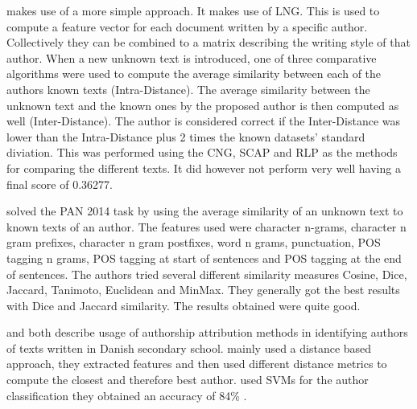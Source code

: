 \cite{layton:2014} makes use of a more simple approach. It makes use of
\gls{LNG}. This is used to compute a feature vector for each document written
by a specific author. Collectively they can be combined to a matrix describing
the writing style of that author. When a new unknown text is introduced, one of
three comparative algorithms were used to compute the average similarity between
each of the authors known texts (Intra-Distance). The average similarity between
the unknown text and the known ones by the proposed author is then computed as
well (Inter-Distance). The author is considered correct if the Inter-Distance
was lower than the Intra-Distance plus 2 times the known datasets' standard
diviation. This was performed using the \gls{CNG}, \gls{SCAP} and \gls{RLP} as
the methods for comparing the different texts. It did however not perform very
well having a final score of 0.36277.

\cite{castro2015} solved the PAN 2014 task by using the average similarity of
an unknown text to known texts of an author. The features used were character
n-grams, character n gram prefixes, character n gram postfixes, word n grams,
punctuation, \gls{POS} tagging n grams, \gls{POS} tagging at start of sentences
and \gls{POS} tagging at the end of sentences. The authors tried several
different similarity measures Cosine, Dice, Jaccard, Tanimoto, Euclidean and
MinMax. They generally got the best results with Dice and Jaccard similarity.
The results obtained were quite good.

\cite{hansen2014} and \cite{aalykke2016} both describe usage of authorship
attribution methods in identifying authors of texts written in Danish secondary
school. \cite{aalykke2016} mainly used a distance based approach, they extracted
features and then used different distance metrics to compute the closest and
therefore best author. \cite{hansen2014} used \gls{SVM}s for the author
classification they obtained an accuracy of 84\% .

